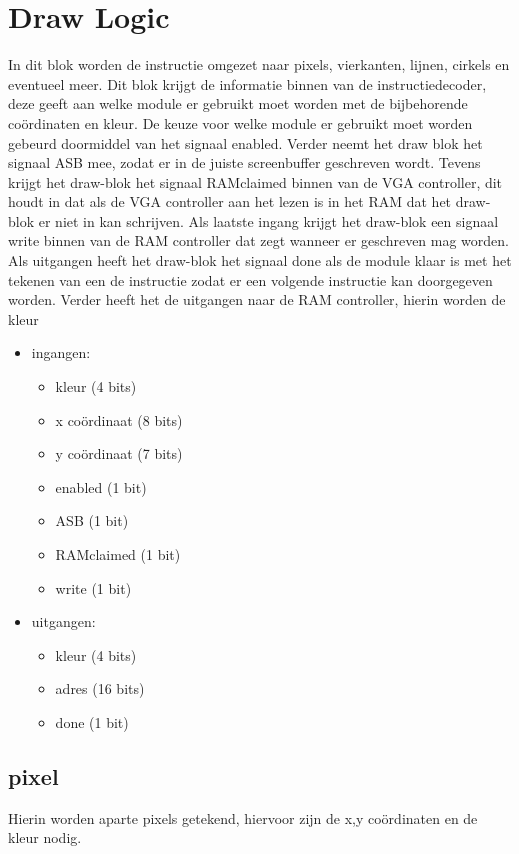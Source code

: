 \documentclass{scrreprt} %
\begin{document}
\section{Draw Logic}
In dit blok worden de instructie omgezet naar pixels, vierkanten, lijnen, cirkels en eventueel meer. Dit blok krijgt de informatie binnen van de instructiedecoder, deze geeft aan welke module er gebruikt moet worden met de bijbehorende coördinaten en kleur.
De keuze voor welke module er gebruikt moet worden gebeurd doormiddel van het signaal enabled. Verder neemt het draw blok het signaal ASB mee, zodat er in de juiste screenbuffer geschreven wordt.
Tevens krijgt het draw-blok het signaal RAMclaimed binnen van de VGA controller, dit houdt in dat als de VGA controller aan het lezen is in het RAM dat het draw-blok er niet in kan schrijven.
Als laatste ingang krijgt het draw-blok een signaal write binnen van de RAM controller dat zegt wanneer er geschreven mag worden.
Als uitgangen heeft het draw-blok het signaal done als de module klaar is met het tekenen van een de instructie zodat er een volgende instructie kan doorgegeven worden. Verder heeft het de uitgangen naar de RAM controller, hierin worden de kleur 

\begin {itemize}
\item ingangen:
\begin {itemize}
\item kleur (4 bits)
\item x coördinaat (8 bits)
\item y coördinaat (7 bits)
\item enabled (1 bit)
\item ASB (1 bit)
\item RAMclaimed (1 bit)
\item write (1 bit)
\end {itemize}

\item uitgangen:
\begin {itemize}
\item kleur (4 bits)
\item adres (16 bits)
\item done (1 bit)
\end {itemize}
\end{itemize}

\subsection { pixel}
Hierin worden aparte pixels getekend, hiervoor zijn de x,y coördinaten en de kleur nodig.
\end{document}
